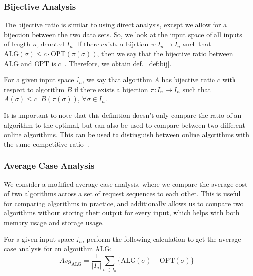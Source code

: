 \subsubsection*{Bijective Analysis}
\label{sec:Bij}
The bijective ratio is similar to using direct analysis, except we allow for a bijection between the two data sets. So, we look at the input space of all inputs of length $n$, denoted $I_n$. If there exists a bijetion $\pi:I_n \rightarrow I_n$ such that $\mathrm{ALG}(\sigma) \leq c\cdot \mathrm{OPT}(\pi(\sigma))$, then  we say that the bijective ratio between $\mathrm{ALG}$ and $\mathrm{OPT}$ is $c$~\cite{bij2016}. Therefore, we obtain def.~\ref{def:bij}. 

\begin{definition}
    \label{def:bij}
    For a given input space $I_n$, we say that algorithm $A$ has bijective ratio $c$ with respect to algorithm $B$ if there exists a bijection $\pi:I_n \rightarrow I_n$ such that $A(\sigma) \leq c\cdot B(\pi(\sigma))$, $\forall \sigma \in I_n$. 
\end{definition}

It is important to note that this definition doesn't only compare the ratio of an algorithm to the optimal, but can also be used to compare between two different online algorithms. This can be used to distinguish between online algorithms with the same competitive ratio~\cite{bij2016}.

\subsubsection*{Average Case Analysis}
\label{sec:Avg}
We consider a modified average case analysis, where we compare the average cost of two algorithms across a set of request sequences to each other. This is useful for comparing algorithms in practice, and additionally allows us to compare two algorithms without storing their output for every input, which helps with both memory usage and storage usage.

\begin{definition}
    \label{def:avg}
    For a given input space $I_n$, perform the following calculation to get the average case analysis for an algorithm $\mathrm{ALG}$: 
    \begin{equation*}
        Avg_{\mathrm{ALG}} = \frac{1}{|I_n|}\sum_{\sigma \in I_n} \{\mathrm{ALG}(\sigma) - \mathrm{OPT}(\sigma)\}
    \end{equation*}
\end{definition}